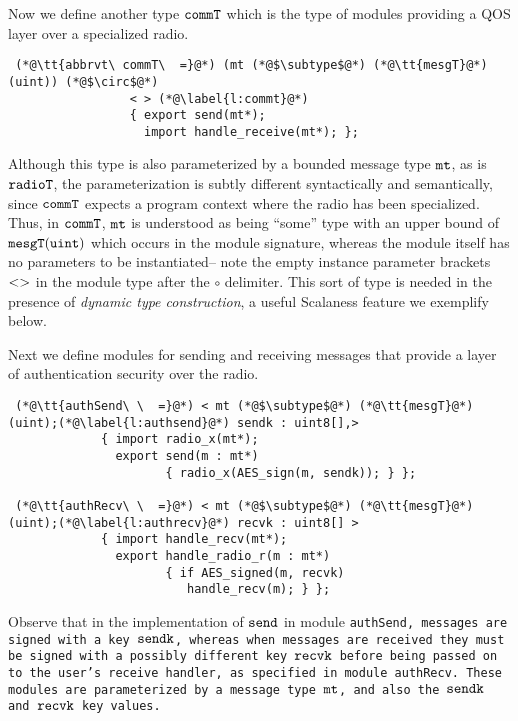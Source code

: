 Now we define another type $\tt{commT}$ which is the type of modules providing a QOS layer over
a specialized radio.
\lstset{numbers=left, numberstyle=\tiny, firstnumber=5, stepnumber=1,
  numbersep=0pt, basicstyle=\ttfamily}
{\scriptsize
\begin{lstlisting}
 (*@\tt{abbrvt\ commT\  =}@*) (mt (*@$\subtype$@*) (*@\tt{mesgT}@*)(uint)) (*@$\circ$@*)  
                 < > (*@\label{l:commt}@*)
                 { export send(mt*); 
                   import handle_receive(mt*); };
\end{lstlisting}} 
\noindent Although this type is also parameterized by a bounded message type $\tt{mt}$, as is
$\tt{radioT}$, the parameterization is subtly different syntactically and semantically, since
$\tt{commT}$ expects a program context where the radio has been specialized. Thus, in
$\tt{commT}$, $\tt{mt}$ is understood as being ``some'' type with an upper bound of
$\tt{mesgT(uint)}$ which occurs in the module signature, whereas the module itself has no
parameters to be instantiated-- note the empty instance parameter brackets $\tt{< >}$ in the
module type after the $\circ$ delimiter. This sort of type is needed in the presence of
\emph{dynamic type construction}, a useful Scalaness feature we exemplify below.

Next we define modules for sending and receiving messages that provide a layer of authentication
security over the radio.
\lstset{numbers=left, numberstyle=\tiny, firstnumber=9, stepnumber=1,
  numbersep=0pt, basicstyle=\ttfamily}
 {\scriptsize
\begin{lstlisting}
 (*@\tt{authSend\ \  =}@*) < mt (*@$\subtype$@*) (*@\tt{mesgT}@*)(uint);(*@\label{l:authsend}@*) sendk : uint8[],>  
             { import radio_x(mt*);
               export send(m : mt*) 
                      { radio_x(AES_sign(m, sendk)); } };

 (*@\tt{authRecv\ \  =}@*) < mt (*@$\subtype$@*) (*@\tt{mesgT}@*)(uint);(*@\label{l:authrecv}@*) recvk : uint8[] >  
             { import handle_recv(mt*);
               export handle_radio_r(m : mt*) 
                      { if AES_signed(m, recvk) 
                         handle_recv(m); } }; 
\end{lstlisting}
}
Observe that in the implementation of $\tt{send}$ in module \tt{auth\-Send}, messages are
signed with a key $\tt{sendk}$, whereas when messages are received they must be signed with a
possibly different key $\tt{recvk}$ before being passed on to the user's receive handler, as
specified in module \tt{authRecv}. These modules are parameterized by a message type $\tt{mt}$,
and also the $\tt{sendk}$ and $\tt{recvk}$ key values.

